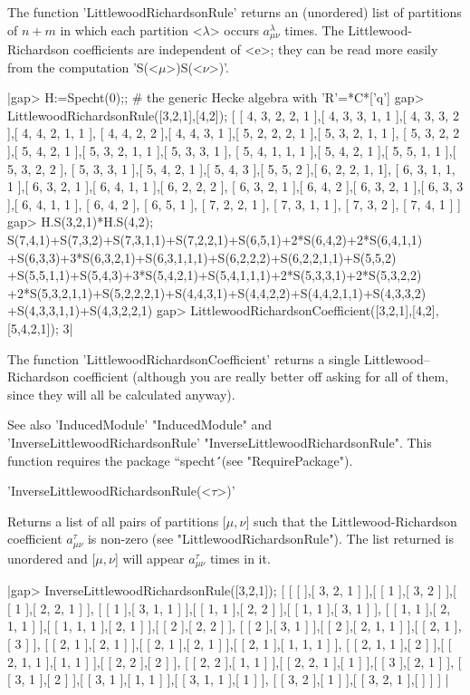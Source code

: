 The function 'LittlewoodRichardsonRule' returns an (unordered) list of 
partitions of $n+m$ in which each partition <$\lambda$> occurs 
$a_{\mu\nu}^\lambda$ times. The Littlewood-Richardson coefficients are 
independent of <e>; they can be read more easily from the computation 
'S(<$\mu$>)\*S(<$\nu$>)'. 

|gap> H:=Specht(0);;    # the generic Hecke algebra with 'R'=*C*['q']
gap> LittlewoodRichardsonRule([3,2,1],[4,2]);
[ [ 4, 3, 2, 2, 1 ],[ 4, 3, 3, 1, 1 ],[ 4, 3, 3, 2 ],[ 4, 4, 2, 1, 1 ],
 [ 4, 4, 2, 2 ],[ 4, 4, 3, 1 ],[ 5, 2, 2, 2, 1 ],[ 5, 3, 2, 1, 1 ], 
  [ 5, 3, 2, 2 ],[ 5, 4, 2, 1 ],[ 5, 3, 2, 1, 1 ],[ 5, 3, 3, 1 ], 
  [ 5, 4, 1, 1, 1 ],[ 5, 4, 2, 1 ],[ 5, 5, 1, 1 ],[ 5, 3, 2, 2 ], 
  [ 5, 3, 3, 1 ],[ 5, 4, 2, 1 ],[ 5, 4, 3 ],[ 5, 5, 2 ],[ 6, 2, 2, 1, 1],
  [ 6, 3, 1, 1, 1 ],[ 6, 3, 2, 1 ],[ 6, 4, 1, 1 ],[ 6, 2, 2, 2 ], 
  [ 6, 3, 2, 1 ],[ 6, 4, 2 ],[ 6, 3, 2, 1 ],[ 6, 3, 3 ],[ 6, 4, 1, 1 ],
  [ 6, 4, 2 ], [ 6, 5, 1 ], [ 7, 2, 2, 1 ], [ 7, 3, 1, 1 ], [ 7, 3, 2 ], 
  [ 7, 4, 1 ] ]
gap> H.S(3,2,1)*H.S(4,2);
S(7,4,1)+S(7,3,2)+S(7,3,1,1)+S(7,2,2,1)+S(6,5,1)+2*S(6,4,2)+2*S(6,4,1,1)
+S(6,3,3)+3*S(6,3,2,1)+S(6,3,1,1,1)+S(6,2,2,2)+S(6,2,2,1,1)+S(5,5,2)
+S(5,5,1,1)+S(5,4,3)+3*S(5,4,2,1)+S(5,4,1,1,1)+2*S(5,3,3,1)+2*S(5,3,2,2)
+2*S(5,3,2,1,1)+S(5,2,2,2,1)+S(4,4,3,1)+S(4,4,2,2)+S(4,4,2,1,1)+S(4,3,3,2)
+S(4,3,3,1,1)+S(4,3,2,2,1)
gap> LittlewoodRichardsonCoefficient([3,2,1],[4,2],[5,4,2,1]);
3|

The function 'LittlewoodRichardsonCoefficient' returns a single
Littlewood--Richardson coefficient (although you are really better off
asking for all of them, since they will all be calculated anyway).

See also 'InducedModule' "InducedModule" and 
'InverseLittlewoodRichardsonRule' "InverseLittlewoodRichardsonRule".
This function requires the package ``specht\'\'\ (see "RequirePackage").



'InverseLittlewoodRichardsonRule(<$\tau$>)'

Returns a list of all pairs of partitions [$\mu,\nu$] such that the
Littlewood-Richardson coefficient $a_{\mu\nu}^\tau$ is non-zero
(see "LittlewoodRichardsonRule"). The list returned is unordered and
[$\mu,\nu$] will appear $a_{\mu\nu}^\tau$ times in it.

|gap> InverseLittlewoodRichardsonRule([3,2,1]);
[ [ [  ],[ 3, 2, 1 ] ],[ [ 1 ],[ 3, 2 ] ],[ [ 1 ],[ 2, 2, 1 ] ], 
  [ [ 1 ],[ 3, 1, 1 ] ],[ [ 1, 1 ],[ 2, 2 ] ],[ [ 1, 1 ],[ 3, 1 ] ], 
  [ [ 1, 1 ],[ 2, 1, 1 ] ],[ [ 1, 1, 1 ],[ 2, 1 ] ],[ [ 2 ],[ 2, 2 ] ], 
  [ [ 2 ],[ 3, 1 ] ],[ [ 2 ],[ 2, 1, 1 ] ],[ [ 2, 1 ],[ 3 ] ], 
  [ [ 2, 1 ],[ 2, 1 ] ],[ [ 2, 1 ],[ 2, 1 ] ],[ [ 2, 1 ],[ 1, 1, 1 ] ], 
  [ [ 2, 1, 1 ],[ 2 ] ],[ [ 2, 1, 1 ],[ 1, 1 ] ],[ [ 2, 2 ],[ 2 ] ], 
  [ [ 2, 2 ],[ 1, 1 ] ],[ [ 2, 2, 1 ],[ 1 ] ],[ [ 3 ],[ 2, 1 ] ], 
  [ [ 3, 1 ],[ 2 ] ],[ [ 3, 1 ],[ 1, 1 ] ],[ [ 3, 1, 1 ],[ 1 ] ], 
  [ [ 3, 2 ],[ 1 ] ],[ [ 3, 2, 1 ],[ ] ] ]
|

